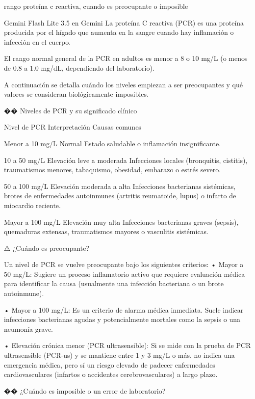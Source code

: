 \documentclass[12pt,a4paper,oneside]{book}
\begin{document}
\begin{iaprompt}
rango proteína c reactiva, cuando es preocupante o imposible
\end{iaprompt}
\begin{iaresp}{Gemini Flash Lite 3.5 en Gemini}
La proteína C reactiva (PCR) es una proteína producida por el hígado que aumenta en la sangre cuando hay inflamación o infección en el cuerpo.

El rango normal general de la PCR en adultos es menor a 8 o 10 mg/L (o menos de 0.8 a 1.0 mg/dL, dependiendo del laboratorio).

A continuación se detalla cuándo los niveles empiezan a ser preocupantes y qué valores se consideran biológicamente imposibles.

�� Niveles de PCR y su significado clínico


Nivel de PCR	Interpretación	Causas comunes

Menor a 10 mg/L	Normal	Estado saludable o inflamación insignificante.

10 a 50 mg/L	Elevación leve a moderada	Infecciones locales (bronquitis, cistitis), traumatismos menores, tabaquismo, obesidad, embarazo o estrés severo.

50 a 100 mg/L	Elevación moderada a alta	Infecciones bacterianas sistémicas, brotes de enfermedades autoinmunes (artritis reumatoide, lupus) o infarto de miocardio reciente.

Mayor a 100 mg/L	Elevación muy alta	Infecciones bacterianas graves (sepsis), quemaduras extensas, traumatismos mayores o vasculitis sistémicas.


⚠️ ¿Cuándo es preocupante?

Un nivel de PCR se vuelve preocupante bajo los siguientes criterios:
• Mayor a 50 mg/L: Sugiere un proceso inflamatorio activo que requiere evaluación médica para identificar la causa (usualmente una infección bacteriana o un brote autoinmune).

• Mayor a 100 mg/L: Es un criterio de alarma médica inmediata. Suele indicar infecciones bacterianas agudas y potencialmente mortales como la sepsis o una neumonía grave.

• Elevación crónica menor (PCR ultrasensible): Si se mide con la prueba de PCR ultrasensible (PCR-us) y se mantiene entre 1 y 3 mg/L o más, no indica una emergencia médica, pero sí un riesgo elevado de padecer enfermedades cardiovasculares (infartos o accidentes cerebrovasculares) a largo plazo.

�� ¿Cuándo es imposible o un error de laboratorio?


\end{iaresp}
\end{document}
